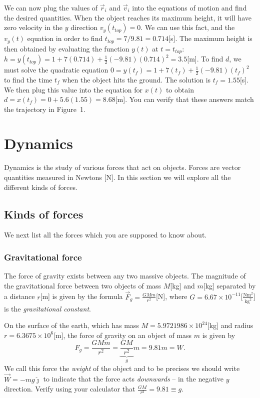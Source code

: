\documentclass[letterpaper,9pt,journal]{IEEEtran}
\newcommand{\be}{\begin{equation}}
\newcommand{\ee}{\end{equation}}
\begin{document}
We can now plug the values of $\vec{r}_i$ and $\vec{v}_i$ into the equations of motion and find the desired quantities.
%
When the object reaches its maximum height, it will have zero velocity
in the $y$ direction $v_{y}(t_{top})=0$.  We can use this fact, and the $v_y(t)$ 
equation in order to find $t_{top} = 7/9.81= 0.714$[s]. The maximum height 
is then obtained by evaluating the function $y(t)$ at $t=t_{top}$: 
$h = y(t_{top})= 1 + 7(0.714) + \tfrac{1}{2}(-9.81)(0.714)^2 = 3.5$[m].
%
To find $d$, we must solve the quadratic equation $0=y(t_f)=1 + 7(t_f) + \tfrac{1}{2}(-9.81)(t_f)^2$
to find the time $t_f$ when the object hits the ground.
The solution is $t_f=1.55$[s]. 
We then plug this value into the equation for $x(t)$ to obtain
$d= x(t_f)=0 + 5.6(1.55)=8.68$[m].
You can verify that these answers match the trajectory in Figure~1.



\section{Dynamics}

Dynamics is the study of various forces that act on objects.
Forces are vector quantities measured in Newtons [N].
In this section we will explore all the different kinds of forces.

\vspace{-3mm}
\subsection{Kinds of forces}
\label{517db664a569f42f769556092e40d53e}%

We next list all the forces which you are supposed to know about.


\subsubsection{Gravitational force}
The force of gravity exists between any two massive objects.
The magnitude of the gravitational force between two objects of 
mass $M$[kg] and $m$[kg] separated by a distance $r$[m] is
given by the formula $\vec{F}_g=\frac{GMm}{r^2}$[N], where 
$G=6.67 \times 10^{-11}$[$\frac{\text{Nm}^2}{\text{kg}^2}$] is
the \emph{gravitational constant}.

On the surface of the earth, which has mass $M=5.9721986\times 10^{24}$[kg] 
and radius $r=6.3675\times10^6$[m], the force of gravity on an object of 
mass $m$ is given by
\be
  F_g=\frac{GMm}{r^2} = \underbrace{\frac{GM}{r^2}}_{g}m = 9.81 m = W.
  \label{FORCE-G}
\ee
We call this force the \emph{weight} of the object and to be precises
we should write $\vec{W}=-mg\hat{\jmath}$ to indicate that the force acts
\emph{downwards} -- in the negative $y$ direction.
Verify using your calculator that $\frac{GM}{r^2}=9.81\equiv g$. 
\end{document}
